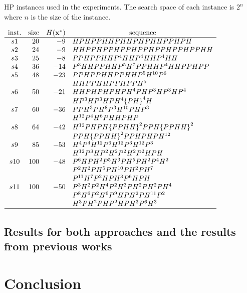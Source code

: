 \begin{table}[htbp]
	\begin{center}
		\caption{HP instances used in the experiments. The search space of each instance is $2^n$ where $n$ is the size of
			the instance.}
		\label{tab:instances}
		{$\begin{array}{c r r l}
			\text{inst.} & \text{size} &  \multicolumn{1}{ c }{H({\bf{x}}^*)} & \multicolumn{1}{c}{\text{sequence}} \\ \hline
			s1 &20 &-9 & HPHPPHHPHHPHPHHPPHPH \\
			s2 &24 &-9 & HHPPHPPHPPHPPHPPHPPHPPHH \\
			s3 &25 &-8 & PPHPPHHP^4HHP^4HHP^4HH \\
			s4 &36 &-14 &  P^3HHPPHHP^5H^7PPHHP^4HHPPHPP\\
			s5 &48 &-23 &  PPHPPHHPPHHP^5H^{10}P^6 \\
			&   &    &  HHPPHHPPHPPH^5 \\
			s6 &50 &-21 &  HHPHPHPHPH^4PHP^3HP^3HP^4 \\
			&   &    & HP^3HP^3HPH^4{\{PH\}}^4H\\
			s7 &60 &-36 &  PPH^3PH^8P^3H^{10}PHP^3\\
			&   &    &  H^{12}P^4H^6PHHPHP\\
			s8 &64 &-42 &   H^{12}PHPH{\{PPHH\}}^2PPH{\{PPHH\}}^2\\
			&   &    &  PPH{\{PPHH\}}^2PPHPHPH^{12}\\
			s9  &85   &-53  & H^4P^4H^{12}P^6 H^{12} P^3 H^{12} P^3 \\
			&   &    &    H^{12} P^3  H P^2 H^2    P^2 H^2  P^2 H P H  \\
			s10  &100  &-48  &  P^6HPH^{2}P^5H^{3}PH^5PH^{2} P^4 H^{2} \\
			&   &    &   P^2  H^2 P  H^5  P H^{10} P H^{2} P H^{7}  \\
			&   &    &  P^{11} H^{7} P^2  H P   H^3  P^{6} H P H \\
			s11 &100  &-50  &  P^3H^{2}P^2H^{4}P^2H^{3}PH^{2} PH^{2}PH^{4} \\
			&   &    & P^8 H^6 P^{2} H^{6} P^{9} H P H^{2} P  H^{11} P^2  \\
			&   &    &H^3 P  H^{2} P H P^2  H P H^3 P^6 H^3\\ \hline
			\end{array}$}
	\end{center}
\end{table}

\subsection{Results for both approaches and the results from previous works}



\section{Conclusion}